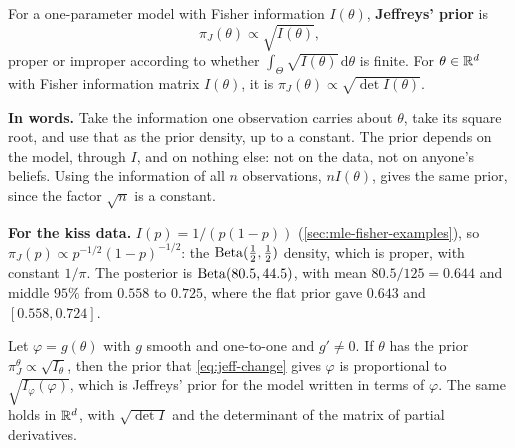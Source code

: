\begin{definition}
\label{def:jeffreys}
For a one-parameter model with Fisher information $I(\theta)$, \textbf{Jeffreys' prior} is
\[
\pi_J(\theta) \propto \sqrt{I(\theta)},
\]
proper or improper according to whether $\int_\Theta \sqrt{I(\theta)}\,\mathrm{d}\theta$ is finite. For $\theta \in \mathbb{R}^d$ with Fisher information matrix $I(\theta)$, it is $\pi_J(\theta) \propto \sqrt{\det I(\theta)}$.
\end{definition}

\begin{inwords}
\textbf{In words.} Take the information one observation carries about $\theta$, take its square root, and use that as the prior density, up to a constant. The prior depends on the model, through $I$, and on nothing else: not on the data, not on anyone's beliefs. Using the information of all $n$ observations, $nI(\theta)$, gives the same prior, since the factor $\sqrt{n}$ is a constant.
\par\smallskip
\textbf{For the kiss data.} $I(p) = 1/(p(1-p))$ (\cref{sec:mle-fisher-examples}), so $\pi_J(p) \propto p^{-1/2}(1-p)^{-1/2}$: the $\mathrm{Beta}(\frac12, \frac12)$ density, which is proper, with constant $1/\pi$. The posterior is $\mathrm{Beta}(80.5, 44.5)$, with mean $80.5/125 = 0.644$ and middle $95\%$ from $0.558$ to $0.725$, where the flat prior gave $0.643$ and $[0.558, 0.724]$.
\end{inwords}

\begin{theorem}
\label{thm:jeffreys-invariant}
Let $\varphi = g(\theta)$ with $g$ smooth and one-to-one and $g' \neq 0$. If $\theta$ has the prior $\pi_J^\theta \propto \sqrt{I_\theta}$, then the prior that \cref{eq:jeff-change} gives $\varphi$ is proportional to $\sqrt{I_\varphi(\varphi)}$, which is Jeffreys' prior for the model written in terms of $\varphi$. The same holds in $\mathbb{R}^d$, with $\sqrt{\det I}$ and the determinant of the matrix of partial derivatives.
\end{theorem}

